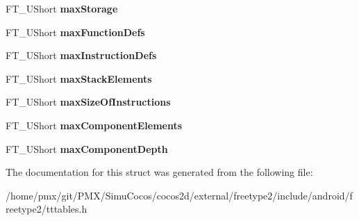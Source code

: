 \begin{DoxyCompactItemize}
F\+T\+\_\+\+U\+Short {\bfseries max\+Storage}
\item 
\mbox{\label{structTT__MaxProfile___acc24e822a62bbfaa86d36f691fcde60b}} 
F\+T\+\_\+\+U\+Short {\bfseries max\+Function\+Defs}
\item 
\mbox{\label{structTT__MaxProfile___a3f7bd433baede417293415cf60f20d8f}} 
F\+T\+\_\+\+U\+Short {\bfseries max\+Instruction\+Defs}
\item 
\mbox{\label{structTT__MaxProfile___a2df9b9ff2a5a9daaa7c3d40fe024637f}} 
F\+T\+\_\+\+U\+Short {\bfseries max\+Stack\+Elements}
\item 
\mbox{\label{structTT__MaxProfile___ac458411198b09d303ec8ae206e6926b6}} 
F\+T\+\_\+\+U\+Short {\bfseries max\+Size\+Of\+Instructions}
\item 
\mbox{\label{structTT__MaxProfile___a110e6d735610c6d8fd89221d03440c32}} 
F\+T\+\_\+\+U\+Short {\bfseries max\+Component\+Elements}
\item 
\mbox{\label{structTT__MaxProfile___a9ae1f117c954e0711b03f1675d6191d9}} 
F\+T\+\_\+\+U\+Short {\bfseries max\+Component\+Depth}
\end{DoxyCompactItemize}


The documentation for this struct was generated from the following file\+:\begin{DoxyCompactItemize}
\item 
/home/pmx/git/\+P\+M\+X/\+Simu\+Cocos/cocos2d/external/freetype2/include/android/freetype2/tttables.\+h\end{DoxyCompactItemize}
